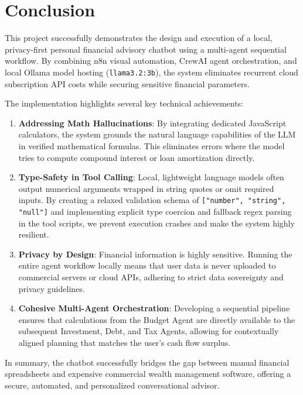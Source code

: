 \chapter{Conclusion}
This project successfully demonstrates the design and execution of a local, privacy-first personal financial advisory chatbot using a multi-agent sequential workflow. By combining n8n visual automation, CrewAI agent orchestration, and local Ollama model hosting (\texttt{llama3.2:3b}), the system eliminates recurrent cloud subscription API costs while securing sensitive financial parameters. 

The implementation highlights several key technical achievements:
\begin{enumerate}
    \item \textbf{Addressing Math Hallucinations}: By integrating dedicated JavaScript calculators, the system grounds the natural language capabilities of the LLM in verified mathematical formulas. This eliminates errors where the model tries to compute compound interest or loan amortization directly.
    \item \textbf{Type-Safety in Tool Calling}: Local, lightweight language models often output numerical arguments wrapped in string quotes or omit required inputs. By creating a relaxed validation schema of \texttt{["number", "string", "null"]} and implementing explicit type coercion and fallback regex parsing in the tool scripts, we prevent execution crashes and make the system highly resilient.
    \item \textbf{Privacy by Design}: Financial information is highly sensitive. Running the entire agent workflow locally means that user data is never uploaded to commercial servers or cloud APIs, adhering to strict data sovereignty and privacy guidelines.
    \item \textbf{Cohesive Multi-Agent Orchestration}: Developing a sequential pipeline ensures that calculations from the Budget Agent are directly available to the subsequent Investment, Debt, and Tax Agents, allowing for contextually aligned planning that matches the user's cash flow surplus.
\end{enumerate}

In summary, the chatbot successfully bridges the gap between manual financial spreadsheets and expensive commercial wealth management software, offering a secure, automated, and personalized conversational advisor.

